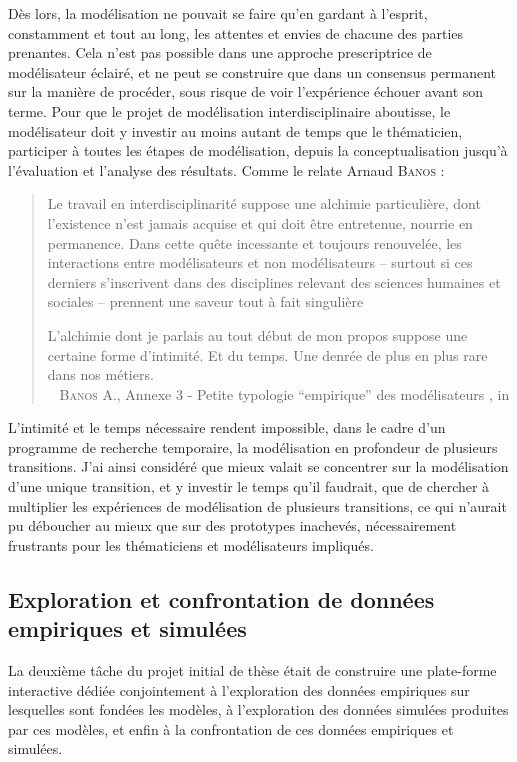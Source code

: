 Dès lors, la modélisation ne pouvait se faire qu'en gardant à l'esprit, constamment et tout au long, les attentes et envies de chacune des parties prenantes.
Cela n'est pas possible dans une approche prescriptrice de \og modélisateur éclairé\fg{}, et ne peut se construire que dans un consensus permanent sur la manière de procéder, sous risque de voir l'expérience échouer avant son terme.
Pour que le projet de modélisation interdisciplinaire aboutisse, le modélisateur doit y investir au moins autant de temps que le thématicien, participer à toutes les étapes de modélisation, depuis la conceptualisation jusqu'à l'évaluation et l'analyse des résultats.
Comme le relate Arnaud \textsc{Banos} :
\begin{quotation}
	\noindent \og
	Le travail en interdisciplinarité suppose une alchimie particulière, dont l’existence n'est jamais acquise et qui doit être entretenue, nourrie en permanence.
	Dans cette quête incessante et toujours renouvelée, les interactions entre modélisateurs et non modélisateurs -- surtout si ces derniers s'inscrivent dans des disciplines relevant des sciences humaines et sociales -- prennent une saveur tout à fait singulière \textelp{}
	
	\noindent L'alchimie dont je parlais au tout début de mon propos suppose une certaine forme d'intimité.
	Et du temps.
	Une denrée de plus en plus rare dans nos métiers. \fg{} \\
	\mbox{}~ \textsc{Banos} A., \og Annexe 3 - Petite typologie “empirique” des modélisateurs \fg{}, in \textcite[483,485]{ouriachi_lelaboration_2017}
\end{quotation}
L'\og intimité\fg{} et le temps nécessaire rendent impossible, dans le cadre d'un programme de recherche temporaire, la modélisation en profondeur de plusieurs transitions.
J'ai ainsi considéré que mieux valait se concentrer sur la modélisation d'une unique transition, et y investir le temps qu'il faudrait, que de chercher à multiplier les expériences de modélisation de plusieurs transitions, ce qui n'aurait pu déboucher au mieux que sur des prototypes inachevés, nécessairement frustrants pour les thématiciens et modélisateurs impliqués.


\subsection{Exploration et confrontation de données empiriques et simulées}

La deuxième tâche du projet initial de thèse était de construire une plate-forme interactive dédiée conjointement à l'exploration des données empiriques sur lesquelles sont fondées les modèles, à l'exploration des données simulées produites par ces modèles, et enfin à la confrontation de ces données empiriques et simulées.

